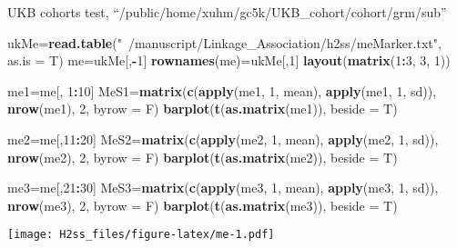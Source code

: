 \documentclass[]{article}
\newenvironment{Shaded}{\begin{snugshade}}{\end{snugshade}}
\newcommand{\DataTypeTok}[1]{\textcolor[rgb]{0.13,0.29,0.53}{#1}}
\newcommand{\DecValTok}[1]{\textcolor[rgb]{0.00,0.00,0.81}{#1}}
\newcommand{\KeywordTok}[1]{\textcolor[rgb]{0.13,0.29,0.53}{\textbf{#1}}}
\newcommand{\NormalTok}[1]{#1}
\newcommand{\OperatorTok}[1]{\textcolor[rgb]{0.81,0.36,0.00}{\textbf{#1}}}
\newcommand{\StringTok}[1]{\textcolor[rgb]{0.31,0.60,0.02}{#1}}
\begin{document}
UKB cohorts test, ``/public/home/xuhm/gc5k/UKB\_cohort/cohort/grm/sub''

\begin{Shaded}
\begin{Highlighting}[]
\NormalTok{ukMe=}\KeywordTok{read.table}\NormalTok{(}\StringTok{"~/manuscript/Linkage_Association/h2ss/meMarker.txt"}\NormalTok{, }\DataTypeTok{as.is =}\NormalTok{ T)}
\NormalTok{me=ukMe[,}\OperatorTok{-}\DecValTok{1}\NormalTok{]}
\KeywordTok{rownames}\NormalTok{(me)=ukMe[,}\DecValTok{1}\NormalTok{]}
\KeywordTok{layout}\NormalTok{(}\KeywordTok{matrix}\NormalTok{(}\DecValTok{1}\OperatorTok{:}\DecValTok{3}\NormalTok{, }\DecValTok{3}\NormalTok{, }\DecValTok{1}\NormalTok{))}

\NormalTok{me1=me[, }\DecValTok{1}\OperatorTok{:}\DecValTok{10}\NormalTok{]}
\NormalTok{MeS1=}\KeywordTok{matrix}\NormalTok{(}\KeywordTok{c}\NormalTok{(}\KeywordTok{apply}\NormalTok{(me1, }\DecValTok{1}\NormalTok{, mean), }\KeywordTok{apply}\NormalTok{(me1, }\DecValTok{1}\NormalTok{, sd)), }\KeywordTok{nrow}\NormalTok{(me1), }\DecValTok{2}\NormalTok{, }\DataTypeTok{byrow =}\NormalTok{ F)}
\KeywordTok{barplot}\NormalTok{(}\KeywordTok{t}\NormalTok{(}\KeywordTok{as.matrix}\NormalTok{(me1)), }\DataTypeTok{beside =}\NormalTok{ T)}

\NormalTok{me2=me[,}\DecValTok{11}\OperatorTok{:}\DecValTok{20}\NormalTok{]}
\NormalTok{MeS2=}\KeywordTok{matrix}\NormalTok{(}\KeywordTok{c}\NormalTok{(}\KeywordTok{apply}\NormalTok{(me2, }\DecValTok{1}\NormalTok{, mean), }\KeywordTok{apply}\NormalTok{(me2, }\DecValTok{1}\NormalTok{, sd)), }\KeywordTok{nrow}\NormalTok{(me2), }\DecValTok{2}\NormalTok{, }\DataTypeTok{byrow =}\NormalTok{ F)}
\KeywordTok{barplot}\NormalTok{(}\KeywordTok{t}\NormalTok{(}\KeywordTok{as.matrix}\NormalTok{(me2)), }\DataTypeTok{beside =}\NormalTok{ T)}

\NormalTok{me3=me[,}\DecValTok{21}\OperatorTok{:}\DecValTok{30}\NormalTok{]}
\NormalTok{MeS3=}\KeywordTok{matrix}\NormalTok{(}\KeywordTok{c}\NormalTok{(}\KeywordTok{apply}\NormalTok{(me3, }\DecValTok{1}\NormalTok{, mean), }\KeywordTok{apply}\NormalTok{(me3, }\DecValTok{1}\NormalTok{, sd)), }\KeywordTok{nrow}\NormalTok{(me3), }\DecValTok{2}\NormalTok{, }\DataTypeTok{byrow =}\NormalTok{ F)}
\KeywordTok{barplot}\NormalTok{(}\KeywordTok{t}\NormalTok{(}\KeywordTok{as.matrix}\NormalTok{(me3)), }\DataTypeTok{beside =}\NormalTok{ T)}
\end{Highlighting}
\end{Shaded}

\texttt{[image: H2ss\_files/figure-latex/me-1.pdf]}
\end{document}
